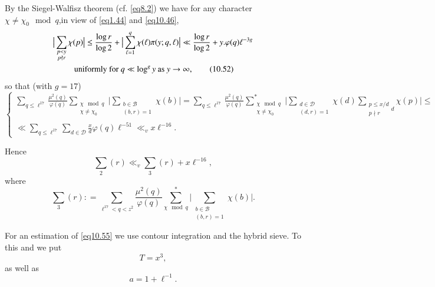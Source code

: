 By the Siegel-Walfisz theorem (cf. \eqref{eq8.2}) we have for any
character $\chi \neq \chi_0 \mod q$,\pageoriginale in view of
\eqref{eq1.44} and \eqref{eq10.46}, 
\begin{gather*}
 \big|\sum_{\substack{p<y \\ p \not \mid r}} \chi (p) \big| \leq
 \frac{\log r}{\log 2}+ \big| \sum_{\ell =1}^{q} \chi (\ell) \pi (y;q,
 \ell ) \big| \ll \frac{\log r}{\log 2} + y. \varphi (q) \ell^{-3g}\\
 \text{ uniformly for } q \ll \log^g y \text{ as } y \to \infty,
 \tag{10.52}\label{eq10.52} 
\end{gather*}
so that (with $g = 17$)
{\fontsize{10}{12}\selectfont
\begin{equation*}
\begin{cases}
\sum\limits_{q \leq \ell ^{17}} \frac{\mu^2 (q)}{\varphi (q)}
\sum\limits_{\substack{\chi \mod q \\ \chi \neq \chi_0}} \bigg|
\sum\limits_{\substack{b \in \mathscr{B} \\(b,r)=1}} \chi (b) \bigg| =
\sum\limits_{q \leq \ell^{17}} \frac{\mu^2 (q)}{\varphi
  (q)}\sum\limits^*_{\substack{\chi \mod q \\ \chi \neq \chi_0}} \bigg|
\sum\limits_{\substack{d \in \mathscr{D} \\(d,r)=1}} \chi (d)
\sum\limits_{\substack{p \leq x/d \\ p \nmid r}d} \chi (p)| \leq \\ 
\ll \sum\limits_{q \leq \ell ^{17}} \sum\limits_{d \in \mathscr{D}}
\frac{x}{d} \varphi (q) \ell^{-51} \ll_v x \ell^{-16}.  
\end{cases}\tag{10.53}\label{eq10.53}
\end{equation*}}

Hence 
\begin{equation*}
\sum_2 (r) \ll_v \sum_3 (r) + x \ell^{-16}, \tag{10.54}\label{eq10.54}
\end{equation*}
where
\begin{equation*}
\sum_3 (r) : = \sum_{\ell^{17} < q<z^2} \frac{\mu^2 (q)}{\varphi (q)}
\sum^*_{\chi \mod q} \bigg|\sum_{\substack{b \in \mathscr{B} \\(b,r)=1}}
\chi (b)\bigg|.\tag{10.55}\label{eq10.55} 
\end{equation*}

For an estimation of \eqref{eq10.55} we use contour integration and the
hybrid sieve. To this and we put 
\begin{equation*}
T=x^3, \tag{10.56}\label{eq10.56}
\end{equation*}
as well as
\begin{equation*}
a = 1+ \ell^{-1}. \tag{10.57}\label{eq10.57}
\end{equation*}

